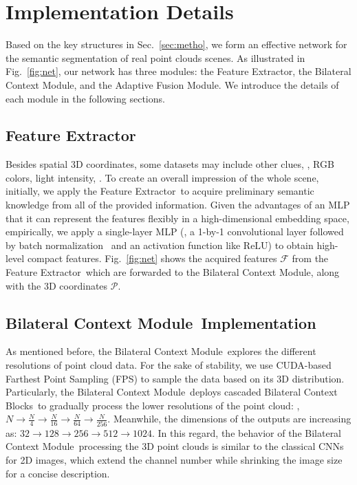 \documentclass[10pt,twocolumn,letterpaper]{article}
\def\ourencoder{Bilateral Context Module}
\def\ourblocks{Bilateral Context Blocks}
\def\ourdecoder{Adaptive Fusion Module}
\def\ourextractor{Feature Extractor}
\begin{document}
%
 \section{Implementation Details}
\label{sec:impl}
Based on the key structures in Sec.~\ref{sec:metho}, we form an effective network for the semantic segmentation of real point clouds scenes. As illustrated in Fig.~\ref{fig:net}, our network has three modules: the \ourextractor, the \ourencoder, and the \ourdecoder. We introduce the details of each module in the following sections.

\subsection{\ourextractor}
\label{sec:impl_extractor}
Besides spatial 3D coordinates, some datasets may include other clues, \eg, RGB colors, light intensity, \etc. To create an overall impression of the whole scene, initially, we apply the \ourextractor~to acquire preliminary semantic knowledge from all of the provided information. Given the advantages of an MLP that it can represent the features flexibly in a high-dimensional embedding space, empirically, we apply a single-layer MLP (\ie, a 1-by-1 convolutional layer followed by  batch normalization~\cite{ioffe2015batch} and an activation function like $\mathrm{ReLU}$) to obtain high-level compact features. Fig.~\ref{fig:net} shows the acquired features $\mathcal{F}$ from the \ourextractor~which are forwarded to the \ourencoder, along with the 3D coordinates $\mathcal{P}$.

\subsection{\ourencoder~Implementation}
\label{sec:impl_encoder}
As mentioned before, the \ourencoder~explores the different resolutions of point cloud data. For the sake of stability, we use CUDA-based Farthest Point Sampling (FPS) to sample the data based on its 3D distribution. Particularly, the \ourencoder~deploys cascaded \ourblocks~to gradually process the lower resolutions of the point cloud: \eg, $N{\rightarrow}{\frac{N}{4}}{\rightarrow}{\frac{N}{16}}{\rightarrow}{\frac{N}{64}}{\rightarrow}{\frac{N}{256}}$. Meanwhile, the dimensions of the outputs are increasing as: $32{\rightarrow}128{\rightarrow}256{\rightarrow}512{\rightarrow}1024$. In this regard, the behavior of the \ourencoder~processing the 3D point clouds is similar to the classical CNNs for 2D images, which extend the channel number while shrinking the image size for a concise description.
\end{document}
